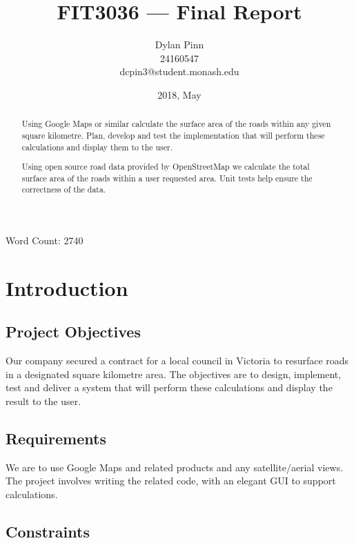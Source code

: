 \documentclass[a4paper,11pt]{article}
\title{FIT3036 --- Final Report}
\author{Dylan Pinn \\ 24160547 \\ dcpin3@student.monash.edu}
\date{2018, May}
\begin{document}
\maketitle
\vspace{-2ex}
\begin{center}
  Word Count: 2740
\end{center}

\begin{abstract}
  Using Google Maps or similar calculate the surface area of the roads within
  any given square kilometre. Plan, develop and test the implementation that
  will perform these calculations and display them to the user.

  Using open source road data provided by OpenStreetMap we calculate the total
  surface area of the roads within a user requested area. Unit tests help ensure
  the correctness of the data.
\end{abstract}

\pagebreak

\tableofcontents
\pagebreak

\section{Introduction}

\subsection{Project Objectives}

Our company secured a contract for a local council in Victoria to resurface
roads in a designated square kilometre area. The objectives are to design,
implement, test and deliver a system that will perform these calculations and
display the result to the user.

\subsection{Requirements}

We are to use Google Maps and related products and any satellite/aerial views.
The project involves writing the related code, with an elegant GUI to support
calculations. \autocite[2]{intro:1}

\subsection{Constraints}
\end{document}
